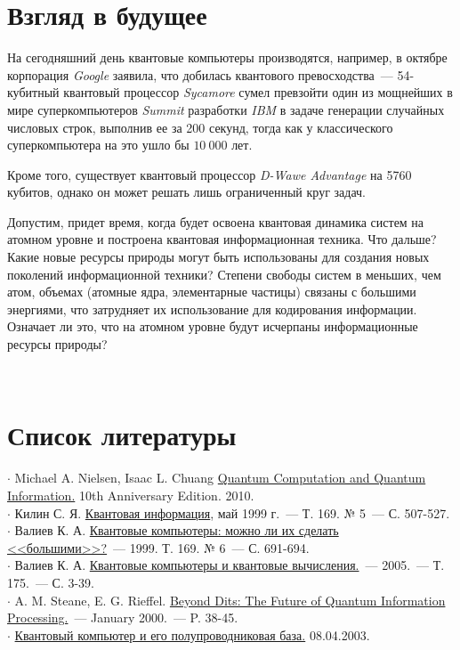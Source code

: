 \begin{multicols}{2}
    \section*{Взгляд в будущее}
    \normalsize{
        На сегодняшний день квантовые компьютеры производятся, например, в октябре корпорация \emph{Google} заявила, что добилась квантового превосходства~--- 54-кубитный квантовый процессор \emph{Sycamore} сумел превзойти один из мощнейших в мире суперкомпьютеров \emph{Summit} разработки \emph{IBM}
        в задаче генерации случайных числовых строк, выполнив ее за 200 секунд, тогда как у классического суперкомпьютера на это ушло бы $10~000$ лет.
        
        Кроме того, существует квантовый процессор \emph{D-Wawe Advantage} на 5760 кубитов, однако он может решать лишь ограниченный круг задач.

        Допустим, придет время, когда будет освоена квантовая динамика систем на атомном уровне и построена квантовая информационная техника. Что дальше? Какие новые ресурсы природы могут быть использованы
        для создания новых поколений информационной техники? Степени свободы систем в меньших, чем атом, объемах (атомные ядра, элементарные частицы) связаны с большими энергиями, что затрудняет их использование для кодирования информации.
        Означает ли это, что на атомном уровне будут исчерпаны информационные ресурсы природы?
    }\\
    \section*{Список литературы}
    \small{
    $\cdot$ Michael A. Nielsen, Isaac L. Chuang \href{https://profmcruz.files.wordpress.com/2017/08/quantum-computation-and-quantum-information-nielsen-chuang.pdf}{Quantum Computation and Quantum Information.} 10th Anniversary Edition. 2010.\\
    $\cdot$ Килин С. Я. \href{https://web.archive.org/web/20100929192824/http://ufn.ru/ru/articles/1999/5/b/}{Квантовая информация}, май 1999 г.~--- Т. 169. № 5~--- С. 507-527.\\
    $\cdot$ Валиев К. А. \href{https://ufn.ru/ru/articles/1999/6/i/}{Квантовые компьютеры: можно ли их сделать <<большими>>?}~--- 1999. Т. 169. № 6~--- С. 691-694.\\
    $\cdot$ Валиев К. А. \href{https://ufn.ru/ru/articles/2005/1/a/}{Квантовые компьютеры и квантовые вычисления.}~--- 2005.~--- Т. 175.~--- С. 3-39.\\
    $\cdot$ A. M. Steane, E. G. Rieffel. \href{https://web.archive.org/web/20061017015251/http://www.fxpal.com/?p=abstract&abstractID=50}{Beyond Dits: The Future of Quantum Information Processing.}~--- January 2000.~--- P. 38-45.\\
    $\cdot$ \href{http://psj.nsu.ru/lector/neizvestniy/}{Квантовый компьютер и его полупроводниковая база.} 08.04.2003.
    }
\end{multicols}